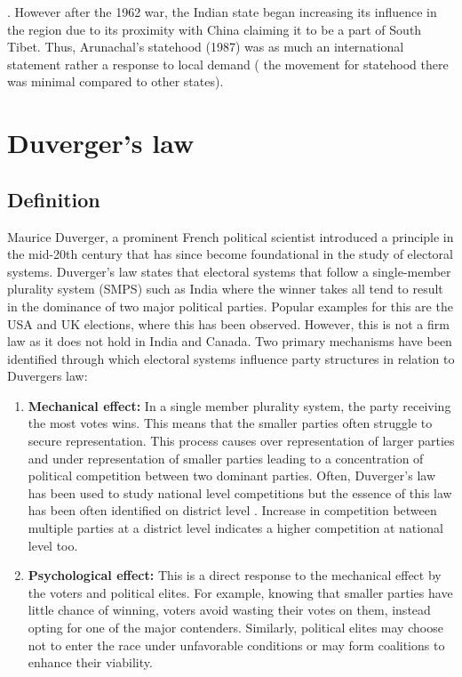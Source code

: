 \citep{verrier_elvin_2008}. However after the 1962 war, the Indian state began increasing its influence in the region due to its proximity with China claiming it to be a part of South Tibet. Thus, Arunachal’s statehood (1987) was as much an international statement rather a response to local demand ( the movement for statehood there was minimal compared to other states).

\section{Duverger's law}
\subsection{Definition}
Maurice Duverger, a prominent French political scientist introduced a principle in the mid-20th century that has since become foundational in the study of electoral systems. Duverger's law states that electoral systems that follow a single-member plurality system (SMPS) such as India where the winner takes all tend to result in the dominance of two major political parties. Popular examples for this are the USA and UK elections, where this has been observed. However, this is not a firm law as it does not hold in India and Canada.
Two primary mechanisms have been identified through which electoral systems influence party structures in relation to Duvergers law:
 \begin{enumerate}
     \item \textbf{Mechanical effect:}  In a single member plurality system, the party receiving the most votes wins. This means that the smaller parties often struggle to secure representation. This process causes over representation of larger parties and under representation of smaller parties leading to a concentration of political competition between two dominant parties. Often, Duverger's law has been used to study national level competitions but the essence of this law has been often identified on district level \citep{cox1997making,GALLAGHER199133,lijphart1994,rae1971political}. Increase in competition between multiple parties at a district level indicates a higher competition at national level too.
     \item \textbf{Psychological effect:} This is a direct response to the mechanical effect by the voters and political elites. For example, knowing that smaller parties have little chance of winning, voters avoid wasting their votes on them, instead opting for one of the major contenders. Similarly, political elites may choose not to enter the race under unfavorable conditions or may form coalitions to enhance their viability.
 \end{enumerate}
